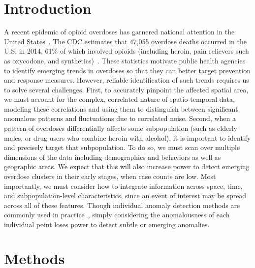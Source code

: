 \documentclass{acm_proc_article-sp}
\begin{document}
\section{Introduction}
\label{sec:introduction}

A recent epidemic of opioid overdoses has garnered national attention in 
the United States~\cite{hhsopioid}. The CDC estimates that 47,055 
overdose deaths occurred in the U.S. in 2014, 61\% of which involved 
opioids (including heroin, pain relievers such as oxycodone, and 
synthetics)~\cite{cdc,neill2017overdose}. These statistics motivate 
public health agencies to identify emerging trends in overdoses so that 
they can better target prevention and response measures.  However, 
reliable identification of such trends requires us to solve several 
challenges.  First, to accurately pinpoint the affected spatial area, we 
must account for the complex, correlated nature of spatio-temporal data, 
modeling these correlations and using them to distinguish between 
significant anomalous patterns and fluctuations due to correlated noise.  
Second, when a pattern of overdoses differentially affects some 
subpopulation (such as elderly males, or drug users who combine heroin 
with alcohol), it is important to identify and precisely target that 
subpopulation.  To do so, we must scan over multiple dimensions of the 
data including demographics and behaviors as well as geographic areas. 
We expect that this will also increase power to detect emerging overdose 
clusters in their early stages, when case counts are low.  Most importantly, we must consider how to integrate information across 
space, time, and subpopulation-level characteristics, since an event of 
interest may be spread across all of these features.  Though individual 
anomaly detection methods are commonly used in 
practice~\cite{kowalska2012maritime,stegle2008gaussian}, simply 
considering the anomalousness of each individual point loses power to 
detect subtle or emerging anomalies.

\section{Methods}
\end{document}
